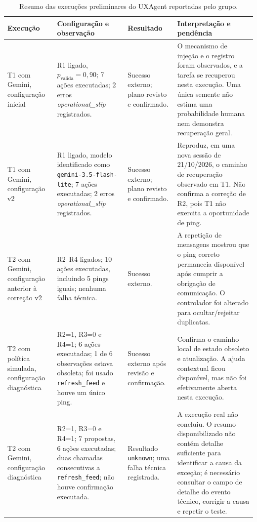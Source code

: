 \documentclass[conference]{IEEEtran}
\begin{document}
\begin{table}[!t]
\centering
\caption{Resumo das execuções preliminares do UXAgent reportadas pelo grupo.}
\label{tab:execucoes-prototipo}
\scriptsize
\renewcommand{\arraystretch}{1.12}
\setlength{\tabcolsep}{4pt}
\begin{tabularx}{\textwidth}{@{}p{2.25cm}p{3.05cm}Y Y@{}}
\toprule
\textbf{Execução} & \textbf{Configuração e observação} & \textbf{Resultado} & \textbf{Interpretação e pendência} \\
\midrule
T1 com Gemini, configuração inicial & R1 ligado, $p_{\mathrm{valida}}=0{,}90$; 7 ações executadas; 2 erros \textit{operational\_slip} registrados. & Sucesso externo; plano revisto e confirmado. & O mecanismo de injeção e o registro foram observados, e a tarefa se recuperou nesta execução. Uma única semente não estima uma probabilidade humana nem demonstra recuperação geral. \\
\midrule
T1 com Gemini, configuração v2 & R1 ligado, modelo identificado como \texttt{gemini-3.5-flash-lite}; 7 ações executadas; 2 erros \textit{operational\_slip} registrados. & Sucesso externo; plano revisto e confirmado. & Reproduz, em uma nova sessão de 21/10/2026, o caminho de recuperação observado em T1. Não confirma a correção de R2, pois T1 não exercita a oportunidade de ping. \\
\midrule
T2 com Gemini, configuração anterior à correção v2 & R2--R4 ligados; 10 ações executadas, incluindo 5 pings iguais; nenhuma falha técnica. & Sucesso externo. & A repetição de mensagens mostrou que o ping correto permanecia disponível após cumprir a obrigação de comunicação. O controlador foi alterado para ocultar/rejeitar duplicatas. \\
\midrule
T2 com política simulada, configuração diagnóstica & R2=1, R3=0 e R4=1; 6 ações executadas; 1 de 6 observações estava obsoleta; foi usado \texttt{refresh\_feed} e houve um único ping. & Sucesso externo após revisão e confirmação. & Confirma o caminho local de estado obsoleto e atualização. A ajuda contextual ficou disponível, mas não foi efetivamente aberta nesta execução. \\
\midrule
T2 com Gemini, configuração diagnóstica & R2=1, R3=0 e R4=1; 7 propostas, 6 ações executadas; duas chamadas consecutivas a \texttt{refresh\_feed}; não houve confirmação executada. & Resultado \texttt{unknown}; uma falha técnica registrada. & A execução real não concluiu. O resumo disponibilizado não contém detalhe suficiente para identificar a causa da exceção; é necessário consultar o campo de detalhe do evento técnico, corrigir a causa e repetir o teste. \\
\bottomrule
\end{tabularx}
\end{table}
\end{document}
